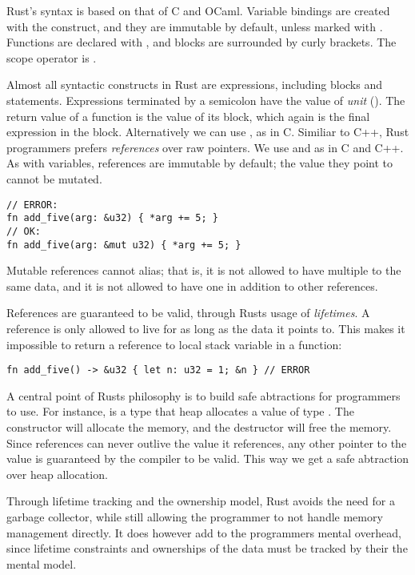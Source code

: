 \documentclass[b5paper,twoside]{report}
\begin{document}
Rust's syntax is based on that of C and OCaml.  Variable bindings are created
with the  construct, and they are immutable by default, unless marked
with .  Functions are declared with , and blocks are
surrounded by curly brackets.  The scope operator is \code{::}.

Almost all syntactic constructs in Rust are expressions, including blocks and
 statements.  Expressions terminated by a semicolon have the value of
\emph{unit} (\code{()}).  The return value of a function is the value of its
block, which again is the final expression in the block. Alternatively we can
use , as in C.  Similiar to C++, Rust programmers prefers
\emph{references} over raw pointers.  We use \code{\&} and \code{*} as in C and
C++.  As with variables, references are immutable by default; the value they
point to cannot be mutated.

\begin{lstlisting}[firstnumber=last]
// ERROR:
fn add_five(arg: &u32) { *arg += 5; }
// OK:
fn add_five(arg: &mut u32) { *arg += 5; }
\end{lstlisting}

Mutable references cannot alias; that is, it is not allowed to have multiple
 to the same data, and it is not allowed to have one 
in addition to other references.

References are guaranteed to be valid, through Rusts usage of
\emph{lifetimes}.  A reference is only allowed to live for as long as the data
it points to.  This makes it impossible to return a reference to local stack
variable in a function:
\begin{lstlisting}[firstnumber=last]
fn add_five() -> &u32 { let n: u32 = 1; &n } // ERROR
\end{lstlisting}

A central point of Rusts philosophy is to build safe abtractions for
programmers to use.  For instance,  is a type that heap
allocates a value of type .  The constructor will allocate the memory,
and the destructor will free the memory.  Since references can never outlive
the value it references, any other pointer to the value is guaranteed by the
compiler to be valid.  This way we get a safe abtraction over heap allocation.

Through lifetime tracking and the ownership model, Rust avoids the need for a
garbage collector, while still allowing the programmer to not handle memory
management directly. It does however add to the programmers mental overhead,
since lifetime constraints and ownerships of the data must be tracked by their
the mental model.
\end{document}
